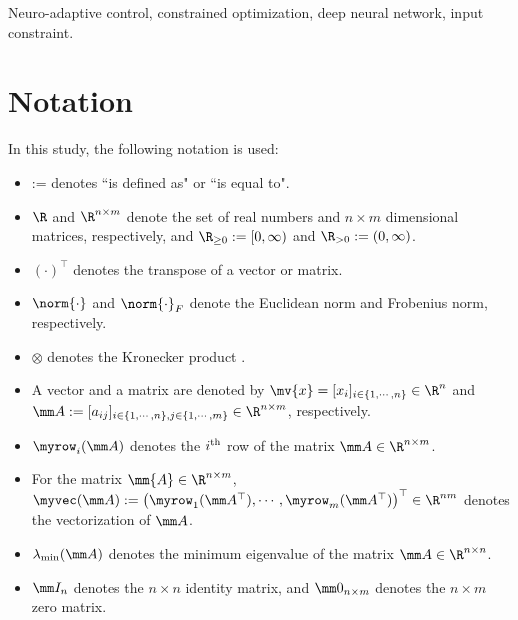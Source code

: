 \documentclass[journal]{IEEEtran}
\begin{document}
\begin{IEEEkeywords}
    Neuro-adaptive control, constrained optimization, deep neural network, input constraint.
\end{IEEEkeywords}

\section*{Notation}
In this study, the following notation is used:

\begin{itemize}
    \item := denotes ``is defined as" or ``is equal to".
    \item $\R$ and $\R^{n\times m}$ denote the set of real numbers and $n\times m$ dimensional matrices, respectively, and $\R_{\ge0}:=[0,\infty)$ and $\R_{>0}:=(0,\infty)$.
    \item $(\cdot)^\top$ denotes the transpose of a vector or matrix.
    \item $\norm{\cdot}$ and $\norm{\cdot}_F$ denote the Euclidean norm and Frobenius norm, respectively.
    \item $\otimes$ denotes the Kronecker product \cite[Chap. 7, Def. 7.1.2]{Bernstein:2009aa}.
    \item A vector and a matrix are denoted by $\mv{x}=[x_i]_{i\in\{1,\cdots,n\}}\in\R^n$ and $
        \mm A
        := 
        [a_{ij}]
        _{
            i\in\{1,\cdots,n\},j\in\{1,\cdots ,m\}
        }\allowbreak\in\R^{n\times m}
        $, respectively.
    \item $\myrow_i(\mm A)$ denotes the $i\textsuperscript{th}$ row of the matrix $\mm A\in\R^{n\times m}$. 
    \item For the matrix $\mm{A}\in\R^{n\times m}$, $\myvec(\mm A):=\left(\myrow_1(\mm A^\top),\cdots,\myrow_m(\mm A^\top) \right)^\top\in\R^{nm}$ denotes the vectorization of $\mm A$.
    \item $\lambda_{\min}(\mm A)$ denotes the minimum eigenvalue of the matrix $\mm A\in\R^{n\times n}$.
    \item $\mm I_n$ denotes the $n\times n$ identity matrix, and $\mm 0_{n\times m}$ denotes the $n\times m$ zero matrix.
\end{itemize}
\end{document}
